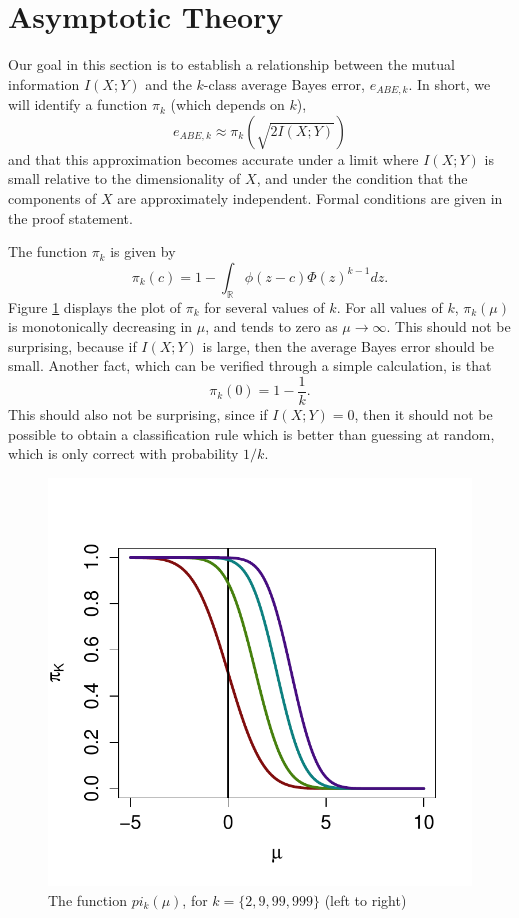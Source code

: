 \documentclass[12pt]{article}
\begin{document}
\section{Asymptotic Theory}

Our goal in this section is to establish a relationship between the
mutual information $I(X; Y)$ and the $k$-class average Bayes error,
$e_{ABE, k}$.  In short, we will identify a function $\pi_k$
(which depends on $k$),
\[
e_{ABE, k} \approx \pi_k(\sqrt{2 I(X; Y)})
\]
and that this approximation becomes accurate under a limit where $I(X; Y)$ is small relative to the dimensionality of $X$,
and under the condition that the components of $X$ are approximately independent.  Formal conditions are given in the proof statement.

The function $\pi_k$ is given by
\[
\pi_k(c) = 1 - \int_{\mathbb{R}} \phi(z - c)  \Phi(z)^{k-1} dz.
\]
Figure \ref{fig:pi} displays the plot of $\pi_k$ for several values of $k$.
For all values of $k$, $\pi_k(\mu)$ is monotonically decreasing in $\mu$, and tends to zero as $\mu \to \infty$.
This should not be surprising, because if $I(X; Y)$ is large, then the average Bayes error should be small.
Another fact, which can be verified through a simple calculation, is that 
\[
\pi_k(0) = 1 - \frac{1}{k}.
\]
This should also not be surprising, since if $I(X; Y) = 0$, then it should not be possible to
obtain a classification rule which is better than guessing at random, which is only correct with probability $1/k$.
\begin{figure}
\centering
\includegraphics[scale = 0.5, clip=true, trim=0 0.2in 0 0.5in]{../info_theory_sims/illus_piK.pdf}
\caption{The function $pi_k(\mu)$, for $k = \{2, 9, 99, 999\}$ (left to right) \label{fig:pi}}
\end{figure}
\end{document}
